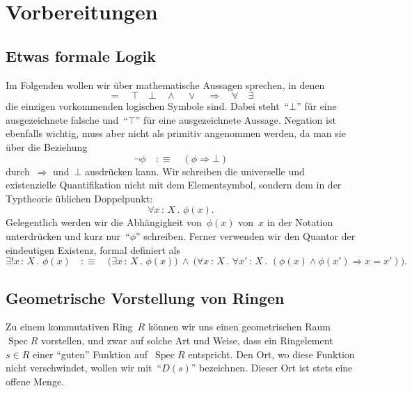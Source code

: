 \documentclass[a4paper,ngerman,12pt]{scrartcl}
\theoremstyle{definition}
\theoremstyle{plain}
\theoremstyle{remark}
\DeclareMathOperator{\Spec}{Spec}
\renewcommand{\_}{\mathpunct{.}\,}
\newcommand{\?}{\,{:}\,}
\begin{document}
\tableofcontents

\section{Vorbereitungen}

\subsection{Etwas formale Logik}

Im Folgenden wollen wir über mathematische Aussagen sprechen, in denen
\[ {=} \quad {\top} \quad {\bot} \quad {\wedge} \quad {\vee} \quad {\Rightarrow} \quad {\forall} \quad {\exists} \]
die einzigen vorkommenden logischen Symbole sind. Dabei steht~"`$\bot$"' für
eine ausgezeichnete falsche und~"`$\top$"' für eine ausgezeichnete Aussage.
Negation ist ebenfalls wichtig, muss aber nicht als primitiv
angenommen werden, da man sie über die Beziehung
\[ \neg\phi \quad:\equiv\quad (\phi \Rightarrow \bot) \]
durch~$\Rightarrow$ und~$\bot$ ausdrücken kann.
Wir schreiben die universelle und existenzielle Quantifikation nicht mit dem
Elementsymbol, sondern dem in der Typtheorie üblichen Doppelpunkt:
\[ \forall x\?X\_ \phi(x). \]
Gelegentlich werden wir die Abhängigkeit von~$\phi(x)$ von~$x$ in der Notation
unterdrücken und kurz nur~"`$\phi$"' schreiben. Ferner verwenden wir den
Quantor der eindeutigen Existenz, formal definiert als
\[ \exists! x\?X\_ \phi(x) \quad:\equiv\quad
  \bigl(\exists x\?X\_ \phi(x)\bigr) \ \wedge\ \bigl(\forall x\?X\_ \forall x'\?X\_
  (\phi(x) \wedge \phi(x') \Rightarrow x = x')\bigr). \]


\subsection{Geometrische Vorstellung von Ringen}

Zu einem kommutativen Ring~$R$ können wir uns einen geometrischen Raum~$\Spec
R$ vorstellen, und zwar auf solche Art und Weise, dass ein
Ringelement~$s \in R$ einer "`guten"' Funktion auf~$\Spec R$ entspricht.
Den Ort, wo diese Funktion nicht verschwindet, wollen wir mit~"`$D(s)$"'
bezeichnen. Dieser Ort ist stets eine offene Menge.
\end{document}
